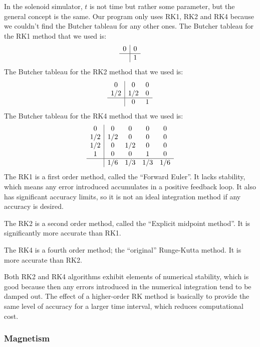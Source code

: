 \documentclass[12pt]{article}
\begin{document}
	In the solenoid simulator, $t$ is not time but rather some parameter, but the general concept is the same. Our program only uses RK1, RK2 and RK4 because we couldn't find the Butcher tableau for any other ones. The Butcher tableau for the RK1 method that we used is:
			\[\begin{array}{c|c}
				0 & 0 \\
				\hline
  				  & 1 \\
			\end{array}\]			
	The Butcher tableau for the RK2 method that we used is:	
			\[\begin{array}{c|cc}
				0   & 0   & 0  \\
				1/2 & 1/2 & 0  \\
				\hline
    				& 0   & 1  \\
			\end{array}\]			
	The Butcher tableau for the RK4 method that we used is:
			\[\begin{array}{c|cccc}
				0   & 0   & 0   & 0   & 0\\
				1/2 & 1/2 & 0   & 0   & 0\\
				1/2 & 0   & 1/2 & 0   & 0\\
				1   & 0   & 0   & 1   & 0\\
				\hline
    				& 1/6 & 1/3 & 1/3 & 1/6\\
			\end{array}\]
	The RK1 is a first order method, called the ``Forward Euler''. It lacks stability, which means any error introduced accumulates in a positive feedback loop. It also has significant accuracy limits, so it is not an ideal integration method if any accuracy is desired.
	
	The RK2 is a second order method, called the ``Explicit midpoint method''. It is significantly more accurate than RK1. 
	
	The RK4 is a fourth order method; the ``original'' Runge-Kutta method. It is more accurate than RK2.
	
	Both RK2 and RK4 algorithms exhibit elements of numerical stability, which is good because then any errors introduced in the numerical integration tend to be damped out. The effect of a higher-order RK method is basically to provide the same level of accuracy for a larger time interval, which reduces computational cost. 
	
	\subsubsection*{Magnetism}
	
\end{document}
